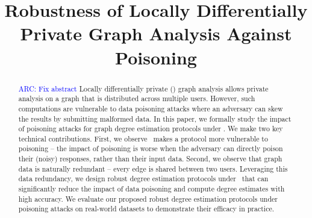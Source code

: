 \documentclass[conference]{IEEEtran}
\newcommand{\arc}[1]{\textcolor{blue}{ ARC: #1}}
\begin{document}


\title{\Large \bf Robustness of Locally Differentially Private Graph Analysis Against Poisoning}


\maketitle

\begin{abstract} \arc{Fix abstract}
 Locally differentially private (\ldp) graph analysis allows private analysis on a graph that is distributed across multiple users.  However, such computations are vulnerable to data poisoning attacks where an adversary can skew the results by submitting malformed data. In this paper, we formally study the impact of poisoning attacks for graph degree estimation protocols under \ldp. We make two key technical contributions. First, we observe \ldp~makes a protocol more vulnerable to poisoning -- the impact of poisoning is worse when the adversary can directly poison their (noisy) responses, rather than their input data. Second, we observe that graph data is naturally redundant -- every edge is shared between two users. Leveraging this data redundancy, we design robust degree estimation protocols under \ldp~that can significantly reduce the impact of data poisoning and compute degree estimates with high accuracy.  We evaluate our proposed robust degree estimation protocols under poisoning attacks on real-world datasets to demonstrate their efficacy in practice. 
\end{abstract}













%


\appendix

\end{document}

